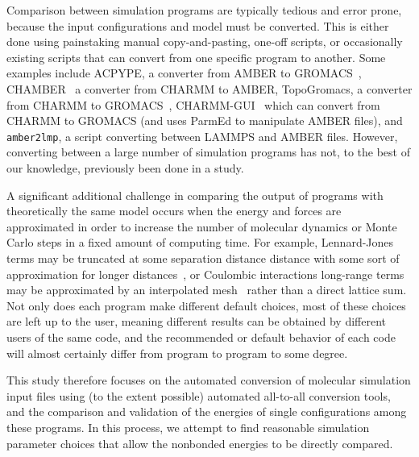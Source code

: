 Comparison between simulation programs are typically tedious and error
prone, because the input configurations and model must be converted.
This is either done using painstaking manual copy-and-pasting,
one-off scripts, or occasionally existing scripts that can convert
from one specific program to another.  Some examples include ACPYPE, a
converter from AMBER to GROMACS~\citep{sousa_da_silva_acpype_2012},
CHAMBER~\citep{crowley_chamber:_2009} a converter from CHARMM to
AMBER, TopoGromacs, a converter from CHARMM to
GROMACS~\citep{vermaas_topogromacs:_2016},
CHARMM-GUI~\citep{lee_charmm-gui_2016} which can convert from CHARMM
to GROMACS (and uses ParmEd to manipulate AMBER files), and {\tt
  amber2lmp}, a script converting between LAMMPS and AMBER
files. However, converting between a large number of simulation
programs has not, to the best of our knowledge, previously been done
in a study.


A significant additional challenge in comparing the output of programs
with theoretically the same model occurs when the energy and forces
are approximated in order to increase the number of molecular dynamics
or Monte Carlo steps in a fixed amount of computing time. For example,
Lennard-Jones terms may be truncated at some separation distance
distance with some sort of approximation for longer
distances~\citep{AllenAndTildesley,shirts_accurate_2007,wu_isotropic_2005},
or Coulombic interactions long-range terms may be approximated by an
interpolated mesh~\citep{essmann_smooth_1995} rather than a direct
lattice sum.  Not only does each program make different default
choices, most of these choices are left up to the user, meaning
different results can be obtained by different users of the same code,
and the recommended or default behavior of each code will almost
certainly differ from program to program to some degree.

This study therefore focuses on the automated conversion of molecular
simulation input files using (to the extent possible) automated
all-to-all conversion tools, and the comparison and validation of the
energies of single configurations among these programs. In this
process, we attempt to find reasonable simulation parameter choices
that allow the nonbonded energies to be directly compared.


